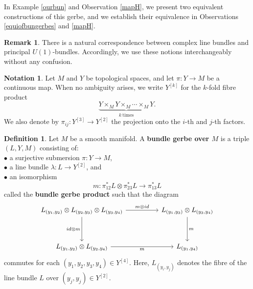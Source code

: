 \documentclass{article}
\theoremstyle{plain}
\theoremstyle{definition}
\newtheorem{defn}[thm]{Definition}
\newtheorem{rem}[thm]{Remark}
\newtheorem{nota}[thm]{Notation}
\begin{document}
In Example \ref{ourbun} and Observation \ref{mapH}, we present two equivalent constructions of this gerbe, and we establish their equivalence in Observations \ref{equiofbungerbes} and \ref{mapH}.
\begin{rem}\cite[page 68]{MR1197353}\label{linebuncirbun}
There is a natural correspondence between complex line bundles and principal $U(1)$-bundles. Accordingly, we use these notions interchangeably without any confusion.
\end{rem}
\begin{nota}
Let $M$ and $Y$ be topological spaces, and let $\pi:Y \longrightarrow M$ be a continuous map. When no ambiguity arises, we write $Y^{[k]}$ for the $k$-fold fibre product 
$$\underbrace{Y \times_M Y \times_M \cdots \times_M Y}_{k ~ \text{times}}.$$
We also denote by $\pi_{ij}:Y^{[3]} \longrightarrow Y^{[2]}$ the projection onto the $i$-th and $j$-th factors.
\end{nota}
\begin{defn}\cite[Definition 12.1 on page 243]{MR2681698}\label{gerbe}
Let $M$ be a smooth manifold. A \textbf{bundle gerbe over $M$} is a triple $(L,Y,M)$ consisting of: \\
$\bullet$ a surjective submersion $\pi:Y \longrightarrow M$, \\
$\bullet$ a line bundle $\lambda:L \longrightarrow Y^{[2]}$, and \\
$\bullet$ an isomorphism
$$m:\pi_{12}^*L \otimes \pi_{23}^*L \longrightarrow \pi_{13}^*L$$
called the \textbf{bundle gerbe product} such that the diagram
\begin{equation}\label{gerbeprod}
\begin{tikzcd}[row sep=huge,column sep=huge]
L_{(y_1,y_2)} \otimes L_{(y_2,y_3)} \otimes L_{(y_3,y_4)} \arrow[r,"m \otimes id"] \arrow[d,"id \otimes m"'] & L_{(y_1,y_3)} \otimes L_{(y_3,y_4)} \arrow[d,"m"] \\
L_{(y_1,y_2)} \otimes L_{(y_2,y_4)} \arrow[r,"m"'] & L_{(y_1,y_4)}
\end{tikzcd}
\end{equation}
commutes for each $(y_1,y_2,y_3,y_4) \in Y^{[4]}$. Here, $L_{(y_i,y_j)}$ denotes the fibre of the line bundle $L$ over $(y_j,y_j) \in Y^{[2]}$.
\end{defn}
\end{document}
